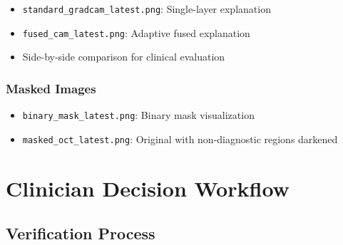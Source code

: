 \documentclass[12pt,a4paper,oneside]{book}
\begin{document}
\begin{itemize}
  \item \texttt{standard\_gradcam\_latest.png}: Single-layer explanation
  \item \texttt{fused\_cam\_latest.png}: Adaptive fused explanation
  \item Side-by-side comparison for clinical evaluation
\end{itemize}

\subsubsection{Masked Images}

\begin{itemize}
  \item \texttt{binary\_mask\_latest.png}: Binary mask visualization
  \item \texttt{masked\_oct\_latest.png}: Original with non-diagnostic regions darkened
\end{itemize}

\section{Clinician Decision Workflow}

\subsection{Verification Process}
\end{document}
